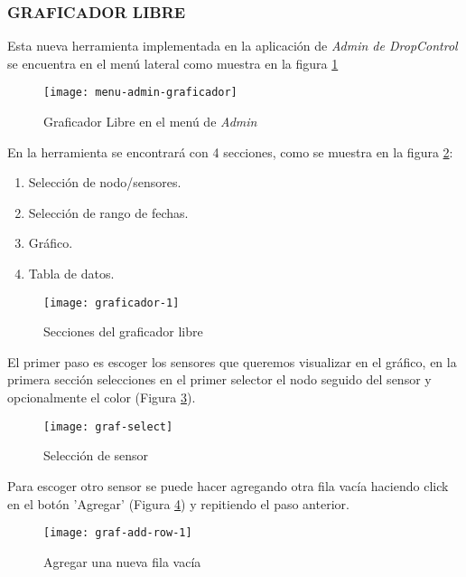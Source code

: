 \subsubsection{GRAFICADOR LIBRE}


Esta nueva herramienta implementada en la aplicación de \textit{Admin de DropControl} se encuentra en el menú lateral como muestra en la figura \ref{fig:menu-admin-graf}

\begin{figure}[H]
	\centering
	\texttt{[image: menu-admin-graficador]}
	\caption{\label{fig:menu-admin-graf} Graficador Libre en el menú de \textit{Admin}}
\end{figure}

En la herramienta se encontrará con 4 secciones, como se muestra en la figura \ref{fig:graf1}:
\begin{enumerate}
    \item Selección de nodo/sensores.
    \item Selección de rango de fechas.
    \item Gráfico.
    \item Tabla de datos.
\end{enumerate}

\begin{figure}[H]
	\centering
	\texttt{[image: graficador-1]}
	\caption{\label{fig:graf1} Secciones del graficador libre}
\end{figure}

El primer paso es escoger los sensores que queremos visualizar en el gráfico, en la primera sección selecciones en el primer selector el nodo seguido del sensor y opcionalmente el color (Figura \ref{fig:grafselect}).

\begin{figure}[H]
	\centering
	\texttt{[image: graf-select]}
	\caption{\label{fig:grafselect} Selección de sensor}
\end{figure}

Para escoger otro sensor se puede hacer agregando otra fila vacía haciendo click en el botón 'Agregar' (Figura \ref{fig:graf-add-row-1}) y repitiendo el paso anterior.

\begin{figure}[H]
	\centering
	\texttt{[image: graf-add-row-1]}
	\caption{\label{fig:graf-add-row-1} Agregar una nueva fila vacía}
\end{figure}

